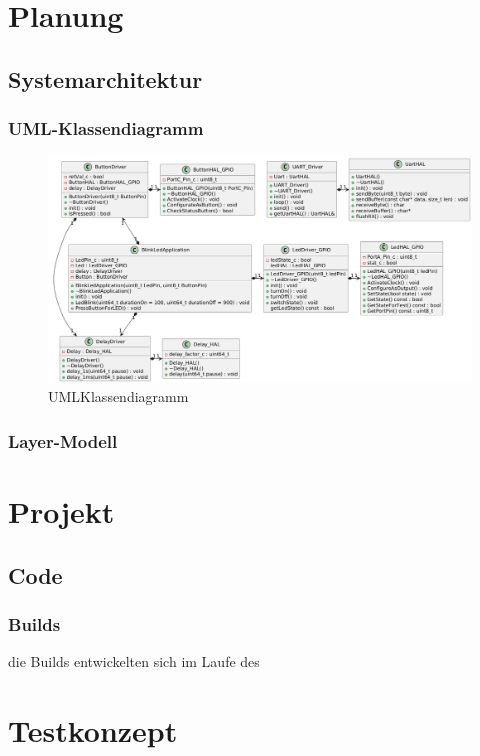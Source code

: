 \documentclass[12pt,a4paper]{article}
\begin{document}
\newpage
\section{Planung}
\subsection{Systemarchitektur}
\subsubsection{UML-Klassendiagramm}
\begin{figure}[htbp]
  \centering
  \includegraphics[width=\textwidth]{LED_Blink_UML.png}
  \caption{UMLKlassendiagramm}
  \label{fig:uml_led_blink}
\end{figure}
\subsubsection{Layer-Modell}

\newpage
\section{Projekt}
\subsection{Code}
\subsubsection{Builds}
die Builds entwickelten sich im Laufe des
\


\newpage
\section{Testkonzept}
\end{document}
